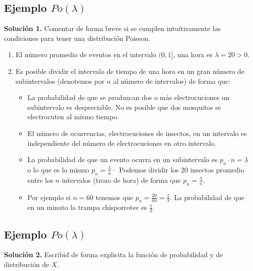 \documentclass[]{book}
\providecommand{\tightlist}{%
  \setlength{\itemsep}{0pt}\setlength{\parskip}{0pt}}
\begin{document}
\hypertarget{ejemplo-polambda-1}{%
\subsection{\texorpdfstring{Ejemplo \(Po(\lambda)\)}{Ejemplo Po(\textbackslash{}lambda)}}\label{ejemplo-polambda-1}}

\textbf{Solución 1.} Comentar de forma breve si se cumplen intuitivamente las condiciones para tener una distribución Poisson.

\begin{enumerate}
\def\labelenumi{\arabic{enumi}.}
\tightlist
\item
  El número promedio de eventos en el intervalo \((0,1]\), una hora es
  \(\lambda=20>0\).
\item
  Es posible dividir el intervalo de tiempo de una hora en un
  gran número de subintervalos (denotemos por \(n\) al número de intervalos) de forma que:

  \begin{itemize}
  \tightlist
  \item
    La probabilidad de que se produzcan dos o más electrocuciones un subintervalo es despreciable. No es posible que dos mosquitos se electrocuten al mismo tiempo.
  \item
    El número de ocurrencias, electrocuciones de insectos, en un intervalo es independiente del número de electrocuciones en otro intervalo.
  \item
    La probabilidad de que un evento ocurra en un subintervalo es \(p_n\cdot n=\lambda\) o lo que es lo mismo \(p_n=\frac{\lambda}{n}\)· Podemos dividir los 20 insectos promedio entre los \(n\) intervalos (trozo de hora) de forma que \(p_n=\frac{\lambda}{n}\).
  \item
    Por ejemplo si \(n=60\) tenemos que \(p_n=\frac{20}{60}=\frac{1}{3}\). La probabilidad de que en un minuto la trampa chisporrotee es \(\frac{1}{3}\).
  \end{itemize}
\end{enumerate}

\hypertarget{ejemplo-polambda-2}{%
\subsection{\texorpdfstring{Ejemplo \(Po(\lambda)\)}{Ejemplo Po(\textbackslash{}lambda)}}\label{ejemplo-polambda-2}}

\textbf{Solución 2.} Escribid de forma explicita la función de probabilidad y de distribución de \(X\).
\end{document}
